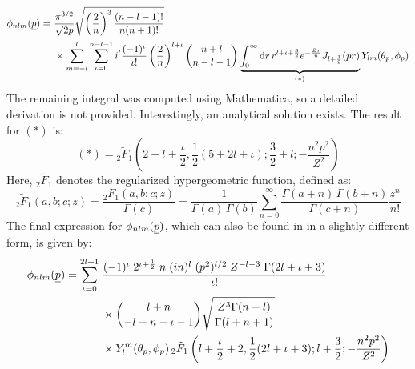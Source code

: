 \begin{equation}
\label{eq:phi_nlm_momentum}
\begin{aligned}
    \phi_{nlm}(\underline{p}) =\ & \frac{\pi^{3/2}}{\sqrt{2p}}\sqrt{\left(\frac{2}{n}\right)^3\frac{(n-l-1)!}{n(n+1)!}}\\
    & \times \sum_{m=-l}^{l}\sum_{\iota=0}^{n-l-1}i^l\frac{(-1)^{\iota}}{\iota!}\left(\frac{2}{n}\right)^{l+\iota}\binom{n+l}{n-l-1}\underbrace{\int_{0}^{\infty}\mathrm{d} r\,r^{l+\iota+\frac{3}{2}}e^{-\frac{Zr}{n}}J_{l+\frac{1}{2}}(pr)}_{(*)} Y_{lm}(\theta_p,\phi_p)
\end{aligned}
\end{equation}
The remaining integral was computed using Mathematica, so a detailed derivation is not provided. Interestingly, an analytical solution exists.
The result for $(*)$ is:
\begin{equation*}
    (*) = {}_2\tilde{F}_1\left(2 + l + \frac{\iota}{2}, \frac{1}{2}(5 + 2l + \iota); \frac{3}{2} + l; -\frac{n^2 p^2}{Z^2}\right)
\end{equation*}
Here, ${}_2\tilde{F}_1$ denotes the regularized hypergeometric function, defined as:
\begin{equation*}
    {}_2\tilde{F}_1(a,b;c;z) = \frac{{}_2F_1(a,b;c;z)}{\Gamma(c)} = \frac{1}{\Gamma(a)\,\Gamma(b)} \sum_{n=0}^{\infty} \frac{\Gamma(a+n)\,\Gamma(b+n)}{\Gamma(c+n)} \frac{z^n}{n!}
\end{equation*}
The final expression for $\phi_{nlm}(\underline{p})$, which can also be found in \cite{Bransdenatomsmolecules} in a slightly different form, is given by:
\begin{align}
    \label{eq:phi_nlm}
    \phi_{nlm}(\underline{p}) = \sum_{\iota=0}^{2l+1} \;
        & \frac{(-1)^{\iota} \; 2^{\iota + \frac{1}{2}} \; n \; (i n)^l \; (p^2)^{l/2} \; Z^{-l-3} \; \Gamma(2l+\iota+3)}{\iota!} \nonumber \\
        & \times \binom{l+n}{-l+n-\iota-1} 
        \sqrt{\frac{Z^3 \Gamma(n-l)}{\Gamma(l+n+1)}} \nonumber \\
        & \times Y_l^m(\theta_p, \phi_p) \,
        {}_2\tilde{F}_1\left(l+\frac{\iota}{2}+2, \frac{1}{2}(2l+\iota+3); l+\frac{3}{2}; -\frac{n^2 p^2}{Z^2}\right)
\end{align}






